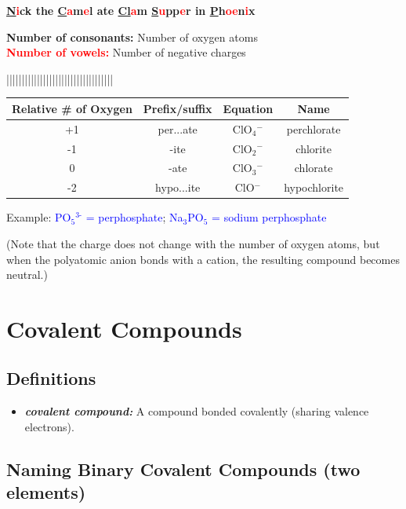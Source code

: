 \documentclass[a4paper, 12pt]{article}
\begin{document}
\noindent \textbf{\underline{N}\textcolor{red}{i}ck the \underline{C}\textcolor{red}{a}m\textcolor{red}{e}l ate \underline{Cl}\textcolor{red}{a}m \underline{S}\textcolor{red}{u}pp\textcolor{red}{e}r in \underline{P}h\textcolor{red}{oe}n\textcolor{red}{i}x}

\textbf{Number of consonants:} Number of oxygen atoms
\\
\textbf{\textcolor{red}{Number of vowels:}} Number of negative charges

\noindent |||||||||||||||||||||||||||||||||||
\begin{table}[ht]
    \centering
    \begin{tabular}{c|c|c|c}
         \textbf{Relative \# of Oxygen } & \textbf{Prefix/suffix} & \textbf{Equation} & \textbf{Name} \\\hline
        +1 & per...ate & ClO$_4$$^-$ & perchlorate \\
        -1 & -ite & ClO$_2$$^-$ & chlorite \\
        0 & -ate & ClO$_3$$^-$ & chlorate \\
        -2 & hypo...ite & ClO$^-$ & hypochlorite
    \end{tabular}
    \label{tab:my_label}
\end{table}

\noindent Example: \textcolor{blue}{PO$_5$$^{\text{3-}}$ = perphosphate}; \textcolor{blue}{Na$_3$PO$_5$ = sodium perphosphate}

(Note that the charge does not change with the number of oxygen atoms, but when the polyatomic anion bonds with a cation, the resulting compound becomes neutral.)

\section{Covalent Compounds}

\subsection{Definitions}
\begin{itemize}[leftmargin=*,nosep]
    \item \textbf{\emph{covalent compound:}} A compound bonded covalently (sharing valence electrons).
\end{itemize}

\subsection{Naming Binary Covalent Compounds (two elements)}
\fbox {\textbf{\textcolor{blue}{if $>$ 1, number prefix + first element + number prefix + second element + -ide}}} %
\end{document}
